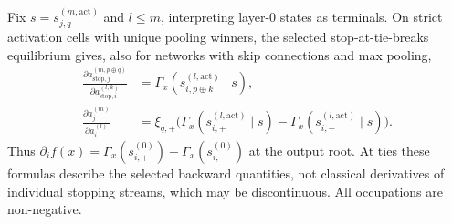 \begin{theoremenv}\label{ptnb:thm:deriv-occ}\label{thm:gradient_occupation}\label{ptnb:thm:gradient}
Fix $s=s_{j,q}^{(m,\mathrm{act})}$ and $l\leq m$, interpreting layer-$0$ states as terminals.
On strict activation cells with unique pooling winners, the selected
stop-at-tie-breaks equilibrium gives, also for networks with skip connections and max pooling,
\begin{align}
 \frac{\partial a_{\mathrm{stop},j}^{(m,p\oplus q)}}
      {\partial a_{\mathrm{stop},i}^{(l,k)}}
    &=\Gamma_x(s_{i,p\oplus k}^{(l,\mathrm{act})}\mid s),\\
 \frac{\partial a_j^{(m)}}{\partial a_i^{(l)}}
    &=\xi_{q,+}\bigl(\Gamma_x(s_{i,+}^{(l,\mathrm{act})}\mid s)
                   -\Gamma_x(s_{i,-}^{(l,\mathrm{act})}\mid s)\bigr).
\end{align}
Thus $\partial_i f(x)=\Gamma_x(s_{i,+}^{(0)})-\Gamma_x(s_{i,-}^{(0)})$ at the output root.
At ties these formulas describe the selected backward quantities, not classical derivatives of
individual stopping streams, which may be discontinuous. All occupations are non-negative.
\end{theoremenv}

